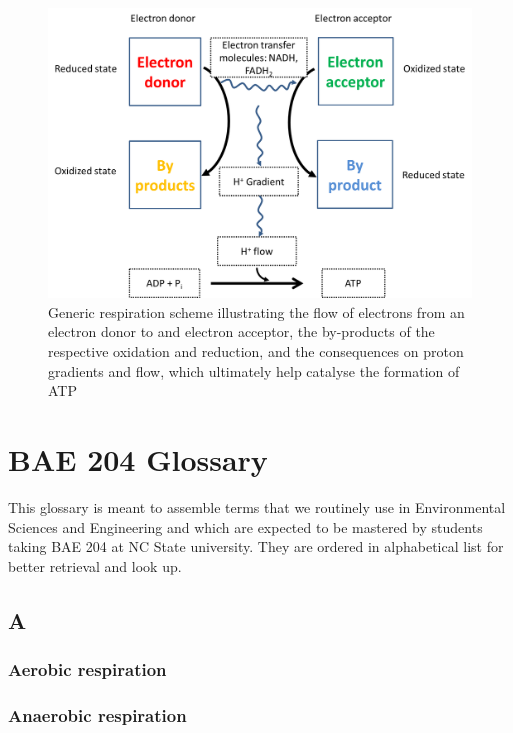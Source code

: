 \documentclass[]{book}
\theoremstyle{definition}
\theoremstyle{definition}
\theoremstyle{definition}
\theoremstyle{remark}
\begin{document}
\begin{figure}

{\centering \includegraphics[width=0.75\linewidth]{pictures/generic-respiration-scheme} 

}

\caption{Generic respiration scheme illustrating the flow of electrons from an electron donor to and electron acceptor, the by-products of the respective oxidation and reduction, and the consequences on proton gradients and flow, which ultimately help catalyse the formation of ATP}\label{fig:generic-resp-scheme}
\end{figure}

\chapter{BAE 204 Glossary}\label{bae-204-glossary}

This glossary is meant to assemble terms that we routinely use in
Environmental Sciences and Engineering and which are expected to be
mastered by students taking BAE 204 at NC State university. They are
ordered in alphabetical list for better retrieval and look up.

\section{A}\label{a}

\subsection{Aerobic respiration}\label{aerobic-respiration}

\subsection{Anaerobic respiration}\label{anaerobic-respiration}
\end{document}
